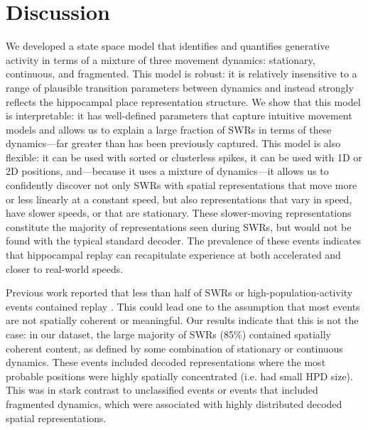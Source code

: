\documentclass[times, twoside]{zHenriquesLab-StyleBioRxiv}
\begin{document}
\section*{Discussion}
We developed a state space model that identifies and quantifies generative activity in terms of a mixture of three movement dynamics: stationary, continuous, and fragmented. This model is robust: it is relatively insensitive to a range of plausible transition parameters between dynamics and instead strongly reflects the hippocampal place representation structure. We show that this model is interpretable: it has well-defined parameters that capture intuitive movement models and allows us to explain a large fraction of SWRs in terms of these dynamics---far greater than has been previously captured. This model is also flexible: it can be used with sorted or clusterless spikes, it can be used with 1D or 2D positions, and---because it uses a mixture of dynamics---it allows us to confidently discover not only SWRs with spatial representations that move more or less linearly at a constant speed, but also representations that vary in speed, have slower speeds, or that are stationary. These slower-moving representations constitute the majority of representations seen during SWRs, but would not be found with the typical standard decoder. The prevalence of these events indicates that hippocampal replay can recapitulate experience at both accelerated and closer to real-world speeds.

Previous work reported that less than half of SWRs or high-population-activity events contained replay \cite{KarlssonAwakereplayremote2009, FosterReversereplaybehavioural2006, DavidsonHippocampalReplayExtended2009}. This could lead one to the assumption that most events are not spatially coherent or meaningful. Our results indicate that this is not the case: in our dataset, the large majority of SWRs (85\%) contained spatially coherent content, as defined by some combination of stationary or continuous dynamics. These events included decoded representations where the most probable positions were highly spatially concentrated (i.e. had small HPD size). This was in stark contrast to unclassified events or events that included fragmented dynamics, which were associated with highly distributed decoded spatial representations. 
\end{document}
